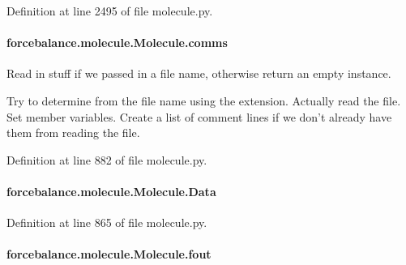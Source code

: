 Definition at line 2495 of file molecule.\-py.

\hypertarget{classforcebalance_1_1molecule_1_1Molecule_adf9f25ebcf955be562ef186b822e237a}{
\paragraph[{comms}]{\setlength{\rightskip}{0pt plus 5cm}forcebalance.\-molecule.\-Molecule.\-comms}}\label{classforcebalance_1_1molecule_1_1Molecule_adf9f25ebcf955be562ef186b822e237a}


Read in stuff if we passed in a file name, otherwise return an empty instance. 

Try to determine from the file name using the extension. Actually read the file. Set member variables. Create a list of comment lines if we don't already have them from reading the file. 

Definition at line 882 of file molecule.\-py.

\hypertarget{classforcebalance_1_1molecule_1_1Molecule_a69c18c3fad45cd38102d9582445f5c6d}{
\paragraph[{Data}]{\setlength{\rightskip}{0pt plus 5cm}forcebalance.\-molecule.\-Molecule.\-Data}}\label{classforcebalance_1_1molecule_1_1Molecule_a69c18c3fad45cd38102d9582445f5c6d}


Definition at line 865 of file molecule.\-py.

\hypertarget{classforcebalance_1_1molecule_1_1Molecule_a2124792d405b58526af41475e4af3c80}{
\paragraph[{fout}]{\setlength{\rightskip}{0pt plus 5cm}forcebalance.\-molecule.\-Molecule.\-fout}}\label{classforcebalance_1_1molecule_1_1Molecule_a2124792d405b58526af41475e4af3c80}


